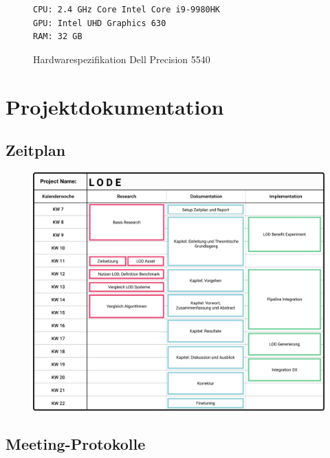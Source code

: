 \begin{figure}[H]
  \begin{lstlisting}
CPU: 2.4 GHz Core Intel Core i9-9980HK
GPU: Intel UHD Graphics 630
RAM: 32 GB
  \end{lstlisting}
\caption{Hardwarespezifikation Dell Precision 5540}
\label{fig:windowsSpecification}
\end{figure}

\newpage

\section{Projektdokumentation}
\subsection{Zeitplan}
\begin{figure}[H]
  \centering
  \includegraphics[width=1\columnwidth]{../ressources/zeitplan.png}
\end{figure}

\newpage

\subsection{Meeting-Protokolle}
